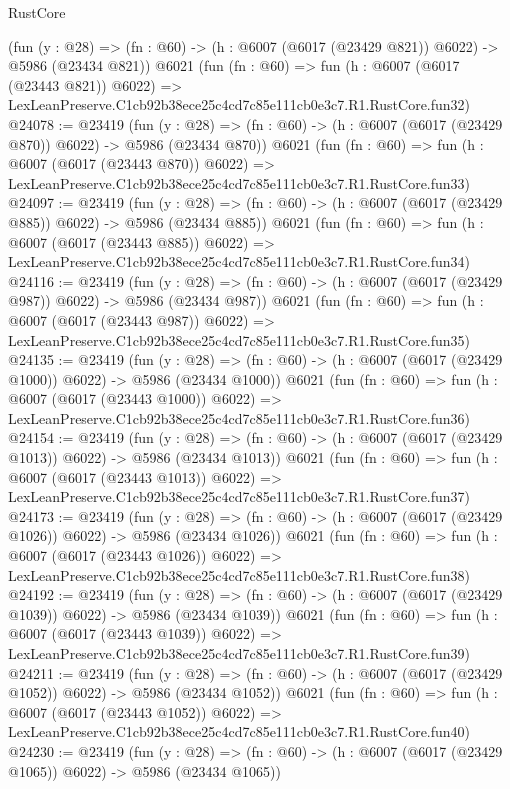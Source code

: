 \begin{lexlean}{RustCore}
\begin{coremodule}
    (fun (y : @28) => (fn : @60) -> (h : @6007 (@6017 (@23429 @821)) @6022) -> @5986 (@23434 @821))
    @6021
    (fun (fn : @60) =>
    fun (h : @6007 (@6017 (@23443 @821)) @6022) =>
    LexLeanPreserve.C1cb92b38ece25c4cd7c85e111cb0e3c7.R1.RustCore.fun32)
@24078 := @23419
    (fun (y : @28) => (fn : @60) -> (h : @6007 (@6017 (@23429 @870)) @6022) -> @5986 (@23434 @870))
    @6021
    (fun (fn : @60) =>
    fun (h : @6007 (@6017 (@23443 @870)) @6022) =>
    LexLeanPreserve.C1cb92b38ece25c4cd7c85e111cb0e3c7.R1.RustCore.fun33)
@24097 := @23419
    (fun (y : @28) => (fn : @60) -> (h : @6007 (@6017 (@23429 @885)) @6022) -> @5986 (@23434 @885))
    @6021
    (fun (fn : @60) =>
    fun (h : @6007 (@6017 (@23443 @885)) @6022) =>
    LexLeanPreserve.C1cb92b38ece25c4cd7c85e111cb0e3c7.R1.RustCore.fun34)
@24116 := @23419
    (fun (y : @28) => (fn : @60) -> (h : @6007 (@6017 (@23429 @987)) @6022) -> @5986 (@23434 @987))
    @6021
    (fun (fn : @60) =>
    fun (h : @6007 (@6017 (@23443 @987)) @6022) =>
    LexLeanPreserve.C1cb92b38ece25c4cd7c85e111cb0e3c7.R1.RustCore.fun35)
@24135 := @23419
    (fun (y : @28) =>
    (fn : @60) -> (h : @6007 (@6017 (@23429 @1000)) @6022) -> @5986 (@23434 @1000))
    @6021
    (fun (fn : @60) =>
    fun (h : @6007 (@6017 (@23443 @1000)) @6022) =>
    LexLeanPreserve.C1cb92b38ece25c4cd7c85e111cb0e3c7.R1.RustCore.fun36)
@24154 := @23419
    (fun (y : @28) =>
    (fn : @60) -> (h : @6007 (@6017 (@23429 @1013)) @6022) -> @5986 (@23434 @1013))
    @6021
    (fun (fn : @60) =>
    fun (h : @6007 (@6017 (@23443 @1013)) @6022) =>
    LexLeanPreserve.C1cb92b38ece25c4cd7c85e111cb0e3c7.R1.RustCore.fun37)
@24173 := @23419
    (fun (y : @28) =>
    (fn : @60) -> (h : @6007 (@6017 (@23429 @1026)) @6022) -> @5986 (@23434 @1026))
    @6021
    (fun (fn : @60) =>
    fun (h : @6007 (@6017 (@23443 @1026)) @6022) =>
    LexLeanPreserve.C1cb92b38ece25c4cd7c85e111cb0e3c7.R1.RustCore.fun38)
@24192 := @23419
    (fun (y : @28) =>
    (fn : @60) -> (h : @6007 (@6017 (@23429 @1039)) @6022) -> @5986 (@23434 @1039))
    @6021
    (fun (fn : @60) =>
    fun (h : @6007 (@6017 (@23443 @1039)) @6022) =>
    LexLeanPreserve.C1cb92b38ece25c4cd7c85e111cb0e3c7.R1.RustCore.fun39)
@24211 := @23419
    (fun (y : @28) =>
    (fn : @60) -> (h : @6007 (@6017 (@23429 @1052)) @6022) -> @5986 (@23434 @1052))
    @6021
    (fun (fn : @60) =>
    fun (h : @6007 (@6017 (@23443 @1052)) @6022) =>
    LexLeanPreserve.C1cb92b38ece25c4cd7c85e111cb0e3c7.R1.RustCore.fun40)
@24230 := @23419
    (fun (y : @28) =>
    (fn : @60) -> (h : @6007 (@6017 (@23429 @1065)) @6022) -> @5986 (@23434 @1065))

\end{coremodule}
\end{lexlean}
